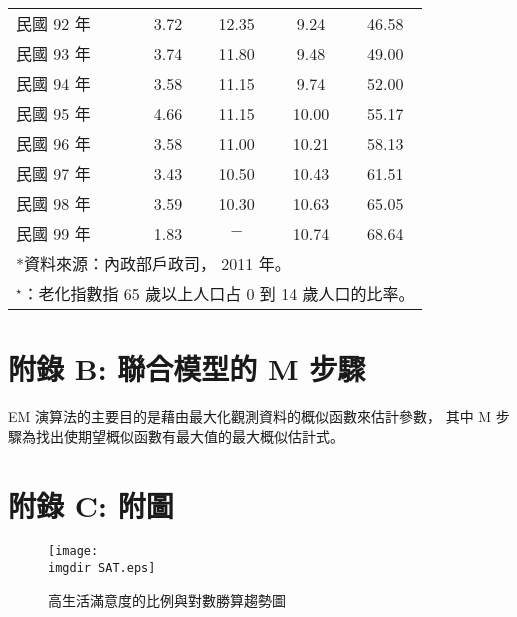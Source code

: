 \begin{table}[H]
\begin{tabular}{lcccc}
     民國 92 年 &      3.72  &     12.35  &      9.24  &     46.58  \\

     民國 93 年 &      3.74  &     11.80  &      9.48  &     49.00  \\

     民國 94 年 &      3.58  &     11.15  &      9.74  &     52.00  \\

     民國 95 年 &      4.66  &     11.15  &     10.00  &     55.17  \\

     民國 96 年 &      3.58  &     11.00  &     10.21  &     58.13  \\

     民國 97 年 &      3.43  &     10.50  &     10.43  &     61.51  \\

     民國 98 年 &      3.59  &     10.30  &     10.63  &     65.05  \\

     民國 99 年 &      1.83  &      $ -$       &     10.74  &     68.64  \\
 \bottomrule
\multicolumn{5}{l}{*資料來源：內政部戶政司， 2011 年。}\\
\multicolumn{5}{l}{$^\star$：老化指數指 65 歲以上人口占 0 到 14 歲人口的比率。}
\end{tabular}
    \end{table}


\newpage
\chapter*{附錄 B: 聯合模型的 M 步驟}
\hspace{7mm}EM 演算法的主要目的是藉由最大化觀測資料的概似函數來估計參數，
其中 M 步驟為找出使期望概似函數有最大值的最大概似估計式。

\chapter*{附錄 C: 附圖}
\renewcommand{\thefigure}{C.\arabic{figure}}

\begin{figure}[H]
    \centering
        \texttt{[image: \\imgdir SAT.eps]}
    \caption{高生活滿意度的比例與對數勝算趨勢圖}
    \label{sat}
\end{figure}
